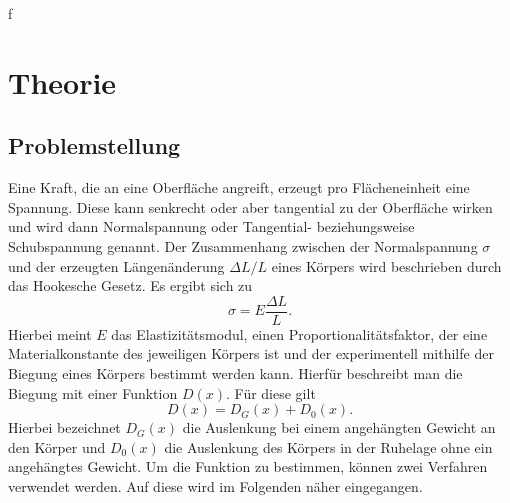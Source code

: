 f\section{Theorie}
\label{sec:Theorie}
\subsection{Problemstellung}
\label{sec:problemstellung}
Eine Kraft, die an eine Oberfläche angreift, erzeugt pro Flächeneinheit eine Spannung.
Diese kann senkrecht oder aber tangential zu der Oberfläche wirken und wird dann
Normalspannung oder Tangential- beziehungsweise Schubspannung genannt.
Der Zusammenhang zwischen der Normalspannung $\sigma$ und
der erzeugten Längenänderung $\Delta L/L$ eines Körpers wird beschrieben durch das Hookesche Gesetz.
Es ergibt sich zu
\begin{equation}
  \sigma = E \frac{\Delta L}{L}.
  \label{eqn:captainhook}
\end{equation}
Hierbei meint $E$ das Elastizitätsmodul, einen Proportionalitätsfaktor, der eine
Materialkonstante des jeweiligen Körpers ist und der experimentell mithilfe der
Biegung eines Körpers bestimmt werden kann.
Hierfür beschreibt man die Biegung mit einer Funktion $D(x)$. Für diese gilt
\begin{equation}
  D(x) = D_G(x) + D_0(x).
  \label{eqn:DmitNull}
\end{equation}
Hierbei bezeichnet $D_G(x)$ die Auslenkung bei einem angehängten Gewicht an den Körper
und $D_0(x)$ die Auslenkung des Körpers in der Ruhelage ohne ein angehängtes Gewicht.
Um die Funktion zu bestimmen, können zwei Verfahren verwendet werden. Auf diese
wird im Folgenden näher eingegangen.

